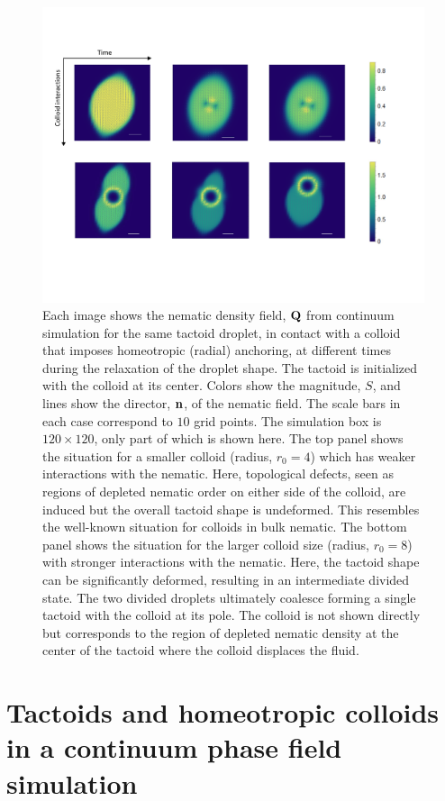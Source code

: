 \documentclass[%
 aip,
 amsmath,amssymb,
 reprint,%
]{revtex4-1}
\begin{document}
\begin{figure}
\centering
\includegraphics[scale=0.7]{media/figure3_v4.pdf}
\caption{Each image shows the nematic density field, ${\bf Q}$ from continuum simulation for the same tactoid droplet, in contact with a colloid that imposes homeotropic (radial) anchoring, at different times during the relaxation of the droplet shape. The tactoid is initialized with the colloid at its center. Colors show the magnitude, $S$, and lines show the director, ${\bf n}$, of the nematic field.  The scale bars in each case correspond to $10$ grid points. The simulation box is $120 \times 120$, only part of which is shown here.  The top panel shows the situation for a smaller colloid (radius, $r_{0}=4$) which has weaker interactions with the nematic. Here, topological defects, seen as regions of depleted nematic order on either side of the colloid, are induced  but the overall tactoid shape is undeformed. This resembles the well-known situation for colloids in bulk nematic. The bottom panel shows the situation for the larger colloid size (radius, $r_{0}=8$) with stronger interactions with the nematic. Here, the tactoid shape can be significantly deformed, resulting in an intermediate divided state. The two divided droplets ultimately coalesce forming a single tactoid with the colloid at its pole. The colloid is not shown directly but corresponds to the region of depleted nematic density at the center of the tactoid where the colloid displaces the fluid.}
\label{fig:tactoidContinuumSimPlots}
\end{figure}

\section{Tactoids and homeotropic colloids in a continuum phase field simulation} \label{sec:tactoidContinuumSim}
\end{document}
